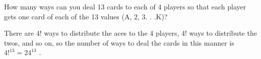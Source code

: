 \question How many ways can you deal 13 cards to each of 4 players 
so that each player gets one card of each of the 13 values 
(A, 2, 3. . .K)? 
\begin{solution}[.5 in]
There are $4!$ ways to distribute the aces to the 4 players, $4!$ ways to distribute the twos, and so 
on, so the number of ways to deal the cards in this manner is 
$4!^{13} = 24^{13}$ .
\end{solution}
